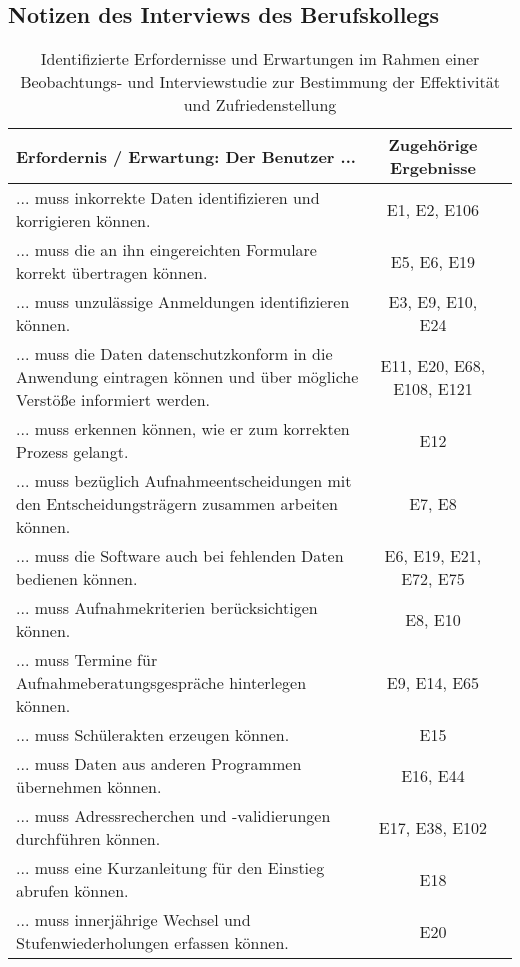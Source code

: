 \subsection{Notizen des Interviews des Berufskollegs}
\label{section-InterviewBerufskolleg}


\begin{landscape}

    \begin{longtable}{p{15cm}cc}
        \caption{Identifizierte Erfordernisse und Erwartungen im Rahmen einer Beobachtungs- und Interviewstudie zur Bestimmung der Effektivität und Zufriedenstellung} \label{tab:mytable} \\
        \toprule
        Erfordernis / Erwartung: Der Benutzer ... & Zugehörige Ergebnisse \\
        \midrule
... muss inkorrekte Daten identifizieren und korrigieren können. & E1, E2, E106 \\
... muss die an ihn eingereichten Formulare korrekt übertragen können. & E5, E6, E19 \\
... muss unzulässige Anmeldungen identifizieren können. & E3, E9, E10, E24 \\
... muss die Daten datenschutzkonform in die Anwendung eintragen können und über mögliche Verstöße informiert werden. & E11, E20, E68, E108, E121 \\
... muss erkennen können, wie er zum korrekten Prozess gelangt. & E12 \\
... muss bezüglich Aufnahmeentscheidungen mit den Entscheidungsträgern zusammen arbeiten können. & E7, E8 \\
... muss die Software auch bei fehlenden Daten bedienen können. & E6, E19, E21, E72, E75 \\
... muss Aufnahmekriterien berücksichtigen können. & E8, E10 \\
... muss Termine für Aufnahmeberatungsgespräche hinterlegen können. & E9, E14, E65 \\
... muss Schülerakten erzeugen können. & E15 \\
... muss Daten aus anderen Programmen übernehmen können. & E16, E44 \\
... muss Adressrecherchen und -validierungen durchführen können. & E17, E38, E102 \\
... muss eine Kurzanleitung für den Einstieg abrufen können. & E18 \\
... muss innerjährige Wechsel und Stufenwiederholungen erfassen können. & E20 \\

\end{longtable}
\end{landscape}
